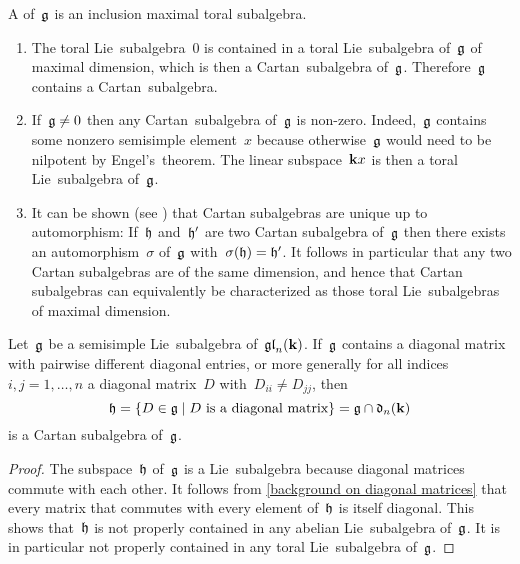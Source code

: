 \begin{definition}
  A  of~$\mathfrak{g}$ is an inclusion maximal toral subalgebra.
\end{definition}


\begin{remark}
  \leavevmode
  \begin{enumerate}
    \item
      The toral Lie~subalgebra~$0$ is contained in a toral Lie~subalgebra of~$\mathfrak{g}$ of maximal dimension, which is then a Cartan~subalgebra of~$\mathfrak{g}$.
      Therefore~$\mathfrak{g}$ contains a Cartan~subalgebra.
    \item
      If~$\mathfrak{g} \neq 0$ then any Cartan~subalgebra of~$\mathfrak{g}$ is non-zero.
      Indeed,~$\mathfrak{g}$ contains some nonzero semisimple element~$x$ because otherwise~$\mathfrak{g}$ would need to be nilpotent by Engel’s~theorem.
      The linear subspace~$\mathbf{k} x$ is then a toral Lie~subalgebra of~$\mathfrak{g}$.
    \item
      It can be shown (see \cite[\S 16.2]{humphreys}) that Cartan subalgebras are unique up to automorphism:
      If~$\mathfrak{h}$ and~$\mathfrak{h}'$ are two Cartan subalgebra of~$\mathfrak{g}$ then there exists an automorphism~$\sigma$ of~$\mathfrak{g}$ with~$\sigma(\mathfrak{h}) = \mathfrak{h}'$.
      It follows in particular that any two Cartan subalgebras are of the same dimension, and hence that Cartan subalgebras can equivalently be characterized as those toral Lie~subalgebras of maximal dimension.
  \end{enumerate}
\end{remark}


\begin{lemma}
  Let~$\mathfrak{g}$ be a semisimple Lie~subalgebra of~$\mathfrak{gl}_n(\mathbf{k})$.
  If~$\mathfrak{g}$ contains a diagonal matrix with pairwise different diagonal entries, or more generally for all indices~$i, j = 1, \dotsc, n$ a diagonal matrix~$D$ with~$D_{ii} \neq D_{jj}$, then
  \[
    \hlie
    =
    \{
      D \in \glie
    \suchthat
      \text{$D$ is a diagonal matrix}
    \}
    =
    \glie
    \cap
    \dlie_n(\kf)
  \]
  is a Cartan subalgebra of~$\mathfrak{g}$.
\end{lemma}


\begin{proof}
  The subspace~$\mathfrak{h}$ of~$\mathfrak{g}$ is a Lie~subalgebra because diagonal matrices commute with each other.
  It follows from \cref{background on diagonal matrices} that every matrix that commutes with every element of~$\mathfrak{h}$ is itself diagonal.
  This shows that~$\mathfrak{h}$ is not properly contained in any abelian Lie~subalgebra of~$\mathfrak{g}$.
  It is in particular not properly contained in any toral Lie~subalgebra of~$\mathfrak{g}$.
\end{proof}


